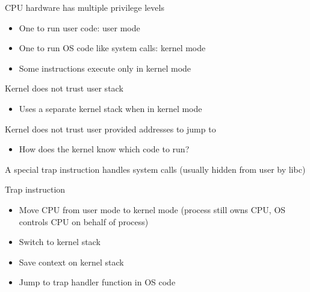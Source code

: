 \begin{slide}

    
    CPU hardware has multiple privilege levels
    \begin{itemize}
        \item One to run user code: user mode
        \item One to run OS code like system calls: kernel mode
        \item Some instructions execute only in kernel mode
    \end{itemize}
    \bigskip
    
    Kernel does not trust user stack
    \begin{itemize}
        \item Uses a separate kernel stack when in kernel mode
    \end{itemize}
    \bigskip
    
    Kernel does not trust user provided addresses to jump to 
    \begin{itemize}
        \item How does the kernel know which code to run?
    \end{itemize}
    
\end{slide}

\begin{slide}

    
    \begin{minipage}{0.6\textwidth}
        A special trap instruction handles system calls (usually
        hidden from user by libc)
            
        \bigskip
        
        Trap instruction
        \begin{itemize}
            \item Move CPU from user mode to kernel mode
            (process still owns CPU, OS controls CPU on behalf of process)
            \item Switch to kernel stack
            \item Save context on kernel stack
            \item Jump to trap handler function in OS code
        \end{itemize}
    \end{minipage}
    
\end{slide}

